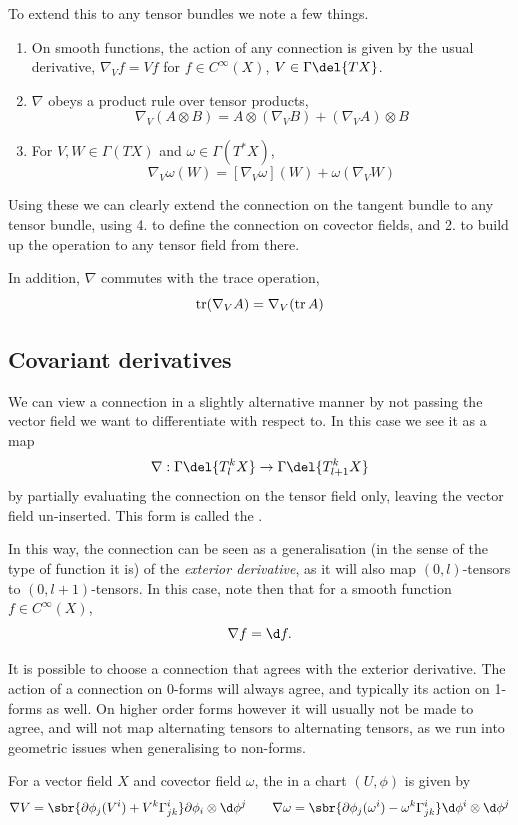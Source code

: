 To extend this to any tensor bundles we note a few things.
\begin{enumerate}
	\item On smooth functions, the action of any connection is given by the usual derivative, \(\nabla_V f = Vf\) for \(f\in C^\infty(X)\), \(V\in \Gamma\del{TX}\).
	\item \(\nabla\) obeys a product rule over tensor products,
	\[\nabla_V(A\otimes B) = A \otimes (\nabla_V B) + (\nabla_V A) \otimes B\]
	\item For \(V,W\in \Gamma(TX)\) and \(\omega \in \Gamma(T^*X)\), 
	\[\nabla_V \omega(W) = [\nabla_V\omega](W) + \omega(\nabla_V W)\]
\end{enumerate}
Using these we can clearly extend the connection on the tangent bundle to any tensor bundle, using 4. to define the connection on covector fields, and 2. to build up the operation to any tensor field from there.

In addition, \(\nabla\) commutes with the trace operation, \[\operatorname{tr} (\nabla_V A) = \nabla_V(\operatorname{tr} A)\]

\subsection{Covariant derivatives}
We can view a connection in a slightly alternative manner by not passing the vector field we want to differentiate with respect to. 
In this case we see it as a map
\[
	\nabla: \Gamma\del{T^k_lX} \to \Gamma\del{T^k_{l+1}X}
\]
by partially evaluating the connection on the tensor field only, leaving the vector field un-inserted.
This form is called the .

In this way, the connection can be seen as a generalisation (in the sense of the type of function it is) of the \emph{exterior derivative}, as it will also map \((0,l)\)-tensors to \((0,l+1)\)-tensors.
In this case, note then that for a smooth function \(f \in C^\infty(X)\),
\[\nabla f = \d f.\]

It is possible to choose a connection that agrees with the exterior derivative.
The action of a connection on 0-forms will always agree, and typically its action on 1-forms as well.
On higher order forms however it will usually not be made to agree, and will not map alternating tensors to alternating tensors, as we run into geometric issues when generalising to non-forms.

For a vector field \(X\) and covector field \(\omega\), the  in a chart \((U, \phi)\) is given by
\[
	\nabla V = \sbr{\partial\phi_j(V^i) + V^k\Gamma_{jk}^i} \partial \phi_i \otimes \d\phi^j \quad \quad \nabla \omega = \sbr{\partial\phi_j(\omega^i) - \omega^k\Gamma_{jk}^i} \d \phi^i \otimes \d\phi^j \nonumber
\]

